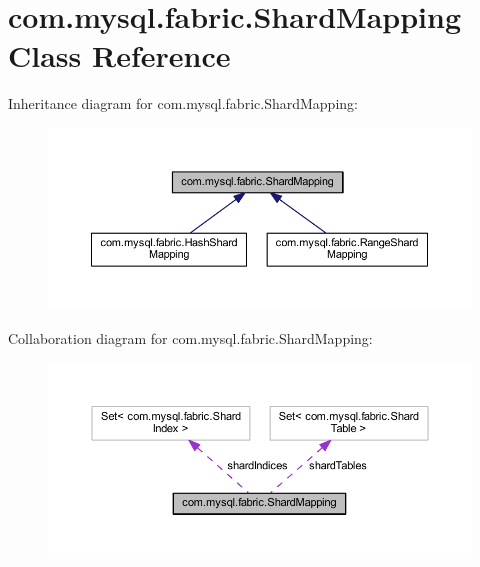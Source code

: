 \hypertarget{classcom_1_1mysql_1_1fabric_1_1_shard_mapping}{}\section{com.\+mysql.\+fabric.\+Shard\+Mapping Class Reference}
\label{classcom_1_1mysql_1_1fabric_1_1_shard_mapping}


Inheritance diagram for com.\+mysql.\+fabric.\+Shard\+Mapping\+:\nopagebreak
\begin{figure}[H]
\begin{center}
\leavevmode
\includegraphics[width=350pt]{classcom_1_1mysql_1_1fabric_1_1_shard_mapping__inherit__graph}
\end{center}
\end{figure}


Collaboration diagram for com.\+mysql.\+fabric.\+Shard\+Mapping\+:\nopagebreak
\begin{figure}[H]
\begin{center}
\leavevmode
\includegraphics[width=350pt]{classcom_1_1mysql_1_1fabric_1_1_shard_mapping__coll__graph}
\end{center}
\end{figure}
